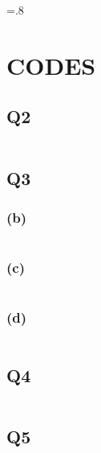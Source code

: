 

\clearpage
{}
{}

\begin{latin}
\baselineskip=.8\baselineskip
\footnotesize
%
%

\section{CODES}
\setcounter{subsection}{1}
\subsection{Q2}
\inputminted[frame=single, bgcolor=gray!10,fontsize=\scriptsize]{matlab}{Matlab/Q2.m}
\clearpage
\subsection{Q3}
\subsubsection{(b)}
\inputminted[frame=single, bgcolor=gray!10,fontsize=\scriptsize]{matlab}{Matlab/Q3b.m}
\clearpage
\subsubsection{(c)}
\inputminted[frame=single, bgcolor=gray!10,fontsize=\scriptsize]{matlab}{Matlab/Q3c.m}
\clearpage
\subsubsection{(d)}
\inputminted[frame=single, bgcolor=gray!10,fontsize=\scriptsize]{matlab}{Matlab/Q3d.m}
\clearpage
\subsection{Q4}
\inputminted[frame=single, bgcolor=gray!10,fontsize=\scriptsize]{matlab}{Matlab/Q4.m}
\clearpage
\subsection{Q5}
\inputminted[frame=single, bgcolor=gray!10,fontsize=\scriptsize]{matlab}{Matlab/Q5.m}


 
\end{latin}
